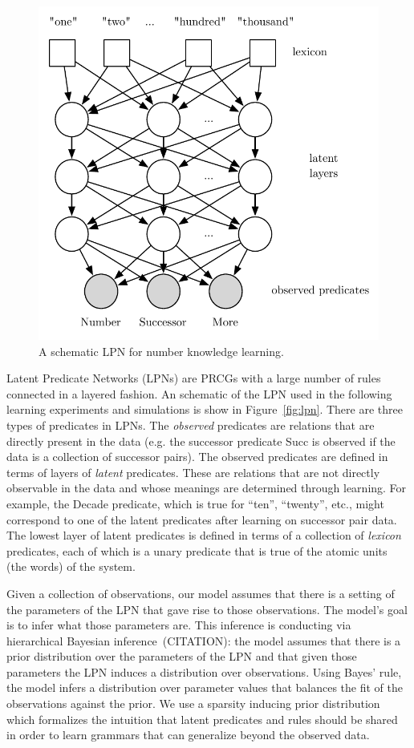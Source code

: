 \documentclass[10pt,letterpaper]{article}
\begin{document}
\begin{figure}[t]
\includegraphics[width=0.9\linewidth]{figures/lpn}
\caption{A schematic LPN for number knowledge learning.}
\end{figure}

Latent Predicate Networks (LPNs) are PRCGs with a large number of
rules connected in a layered fashion. An schematic of the LPN used in
the following learning experiments and simulations is show in
Figure~\ref{fig:lpn}. There are three types of predicates in LPNs. The
\emph{observed} predicates are relations that are directly present in
the data (e.g. the successor predicate Succ is observed if the data is
a collection of successor pairs). The observed predicates are defined
in terms of layers of \emph{latent} predicates. These are relations
that are not directly observable in the data and whose meanings are
determined through learning. For example, the Decade predicate, which
is true for ``ten'', ``twenty'', etc., might correspond to one of the
latent predicates after learning on successor pair data. The lowest
layer of latent predicates is defined in terms of a collection of
\emph{lexicon} predicates, each of which is a unary predicate that is
true of the atomic units (the words) of the system.

Given a collection of observations, our model assumes that there is a
setting of the parameters of the LPN that gave rise to those
observations. The model's goal is to infer what those parameters
are. This inference is conducting via hierarchical Bayesian
inference~(CITATION): the model assumes that there is a prior
distribution over the parameters of the LPN and that given those
parameters the LPN induces a distribution over observations. Using
Bayes' rule, the model infers a distribution over parameter values
that balances the fit of the observations against the prior. We use a
sparsity inducing prior distribution which formalizes the intuition
that latent predicates and rules should be shared in order to learn
grammars that can generalize beyond the observed data.
\end{document}
